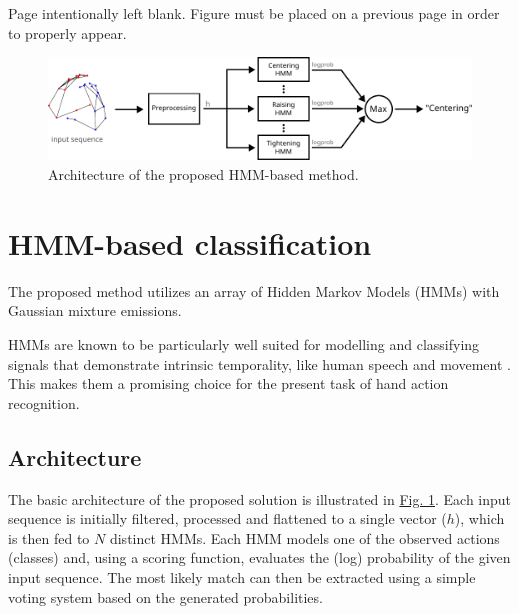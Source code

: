 \documentclass[times,twocolumn,final]{elsarticle}
\begin{document}



Page intentionally left blank.
Figure must be placed on a previous page in order to properly appear. 

\begin{figure}[!t]
\centering
\includegraphics[]{architecture.pdf}
\caption{Architecture of the proposed HMM-based method.}
\label{fig:architecture}
\end{figure}


\newpage \hbox{} \newpage


\section{HMM-based classification}

The proposed method utilizes an array of Hidden Markov Models (HMMs) with Gaussian mixture emissions. 

HMMs are known to be particularly well suited for modelling and classifying signals that demonstrate intrinsic temporality, like human speech \citep{rabinerTutorialHiddenMarkov1989} and movement \citep{papadopoulosRealTimeSkeletonTrackingBasedHuman2014}. This makes them a promising choice for the present task of hand action recognition.

\subsection{Architecture}



The basic architecture of the proposed solution is illustrated in \hyperref[fig:architecture]{Fig. 1}. Each input sequence is initially filtered, processed and flattened to a single vector ($h$), which is then fed to $N$ distinct HMMs. Each HMM models one of the observed actions (classes) and, using a scoring function, evaluates the (log) probability of the given input sequence. The most likely match can then be extracted using a simple voting system based on the generated probabilities. \\ 
\end{document}
